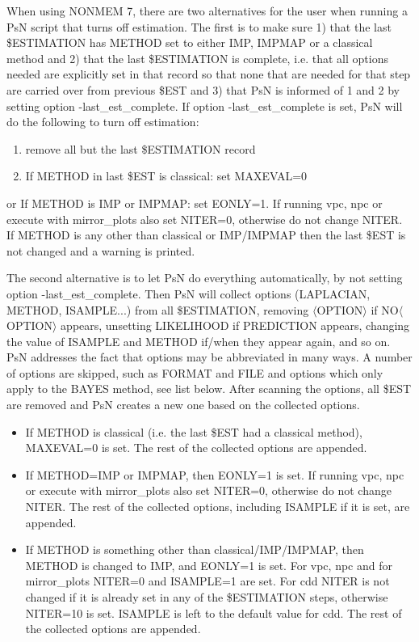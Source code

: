 	When using NONMEM 7, there are two alternatives for the user when running a PsN script that turns off estimation. The first is to make sure 1) that the last \$ESTIMATION has METHOD set to either IMP, IMPMAP or a classical method and 2) that the last \$ESTIMATION is complete, i.e. that all options needed are explicitly set in that record so that none that are needed for that step are carried over from previous \$EST and 3) that PsN is informed of 1 and 2 by setting option -last\_est\_complete. If option -last\_est\_complete is set, PsN will do the following to turn off estimation: 
	\begin{enumerate}
		\item remove all but the last \$ESTIMATION record 
		\item If METHOD in last \$EST is classical: set MAXEVAL=0 
	\end{enumerate}
	or 
	If METHOD is IMP or IMPMAP: set EONLY=1. If running vpc, npc or execute with 
	mirror\_plots also set NITER=0, otherwise do not change NITER.
	If METHOD is any other than classical or IMP/IMPMAP then the last \$EST is not changed and a warning is printed.
	
	The second alternative is to let PsN do everything automatically, by not setting option -last\_est\_complete. Then PsN will collect options (LAPLACIAN, METHOD, ISAMPLE...) from all \$ESTIMATION, removing $\langle$OPTION$\rangle$ if NO$\langle$OPTION$\rangle$ appears, unsetting LIKELIHOOD if PREDICTION appears, changing the value of ISAMPLE and METHOD if/when they appear again, and so on. PsN addresses the fact that options may be abbreviated in many ways. A number of options are skipped, such as FORMAT and FILE and options which only apply to the BAYES method, see list below. After scanning the options, all \$EST are removed and PsN creates a new one based on the collected options. 
	
	\begin{itemize}
		\item If METHOD is classical (i.e. the last \$EST had a classical method), MAXEVAL=0 is set. The rest of the collected options are appended.
		\item If METHOD=IMP or IMPMAP, then EONLY=1 is set. If running vpc, npc or execute with mirror\_plots also set NITER=0, otherwise do not change NITER. The rest of the collected options, including ISAMPLE if it is set, are appended. 
		\item If METHOD is something other than classical/IMP/IMPMAP, then METHOD is changed to IMP, and EONLY=1 is set. For vpc, npc and for mirror\_plots NITER=0 and ISAMPLE=1 are set. For cdd NITER is not changed if it is already set in any of the \$ESTIMATION steps, otherwise NITER=10 is set. ISAMPLE is left to the default value for cdd. The rest of the collected options are appended.
	\end{itemize}
	
